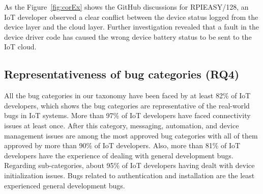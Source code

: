 As the Figure~\autoref{fig:corEx} shows the GitHub discussions for RPIEASY/128, an IoT developer observed a clear conflict between the device status logged from the device layer and the cloud layer. Further investigation revealed that a fault in the device driver code has caused the wrong device battery status to be sent to the IoT cloud.

 \begin{table}[htbp]
\caption{Bug Categories with Positive Correlation}
\begin{center}
\label{tab:correlations}
\end{center}
\end{table}

\subsection{Representativeness of bug categories (RQ4)}
All the bug categories in our taxonomy have been faced by at least 82\% of IoT developers, which shows the bug categories are representative of the real-world bugs in IoT systems. More than 97\% of IoT developers have faced connectivity issues at least once.  After this category, messaging, automation, and device management issues are among the most approved bug categories with all of them approved by more than 90\% of IoT developers. Also, more than 81\% of IoT developers have the experience of dealing with general development bugs. Regarding sub-categories, about 95\% of IoT developers having dealt with device initialization issues. Bugs related to authentication and installation are the least experienced general development bugs. 

